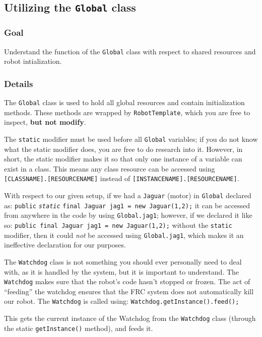 \documentclass[a4paper]{article}
\begin{document}
\pagebreak\subsection{Utilizing the \lstinline{Global} class}
\subsubsection{Goal} Understand the function of the \lstinline{Global} class with respect to shared resources and robot intialization.
\subsubsection{Details} The \lstinline{Global} class is used to hold all global resources and contain initialization methods. These methods are wrapped by \lstinline{RobotTemplate}, which you are free to inspect, \textbf{but not modify}.

The \lstinline{static} modifier must be used before all \lstinline{Global} variables; if you do not know what the static modifier does, you are free to do research into it. However, in short, the static modifier makes it so that only one instance of a variable can exist in a class. This means any class resource can be accessed using \lstinline{[CLASSNAME].[RESOURCENAME]} instead of \lstinline{[INSTANCENAME].[RESOURCENAME]}.

With respect to our given setup, if we had a \lstinline{Jaguar} (motor) in \lstinline{Global} declared as: \lstinline{public} \textit{\lstinline{static}} \lstinline{final Jaguar jag1 = new Jaguar(1,2);} it can be accessed from anywhere in the code by using \lstinline{Global.jag1}; however, if we declared it like so: \lstinline{public final Jaguar jag1 = new Jaguar(1,2);} without the \lstinline{static} modifier, then it could \textit{not} be accessed using \lstinline{Global.jag1}, which makes it an ineffective declaration for our purposes.

The \lstinline{Watchdog} class is not something you should ever personally need to deal with, as it is handled by the system, but it is important to understand. The \lstinline{Watchdog} makes sure that the robot's code hasn't stopped or frozen. The act of ``feeding'' the watchdog ensures that the FRC system does not automatically kill our robot. The \lstinline{Watchdog} is called using: \lstinline{Watchdog.getInstance().feed();}

This gets the current instance of the Watchdog from the \lstinline{Watchdog} class (through the static \lstinline{getInstance()} method), and feeds it.
\end{document}
